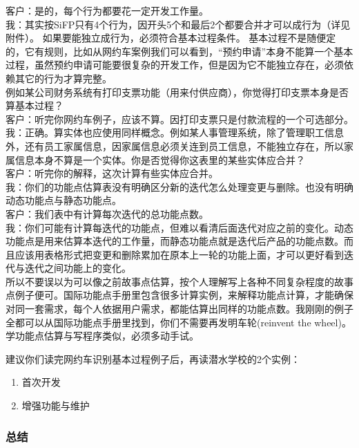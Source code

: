 {\begin{minipage}[t]{0.97\columnwidth}
客户：是的，每个行为都要花一定开发工作量。\\
我：其实按SiFP只有4个行为，因开头5个和最后2个都要合并才可以成行为（详见附件）。
如果要能独立成行为，必须符合基本过程条件。
基本过程不是随便定的，它有规则，比如从网约车案例我们可以看到，``预约申请''本身不能算一个基本过程，虽然预约申请可能要很复杂的开发工作，但是因为它不能独立存在，必须依赖其它的行为才算完整。\\
例如某公司财务系统有打印支票功能（用来付供应商），你觉得打印支票本身是否算基本过程？\\
客户：听完你网约车例子，应该不算。因打印支票只是付款流程的一个可选部分。\\
我：正确。算实体也应使用同样概念。例如某人事管理系统，除了管理职工信息外，还有员工家属信息，因家属信息必须关连到员工信息，不能独立存在，所以家属信息本身不算是一个实体。你是否觉得你这表里的某些实体应合并？\\
客户：听完你的解释，这次计算有些实体应合并。\\
我：你们的功能点估算表没有明确区分新的迭代怎么处理变更与删除。也没有明确动态功能点与静态功能点。\\
客户：我们表中有计算每次迭代的总功能点数。\\
我：你们可能有计算每迭代的功能点，但难以看清后面迭代对应之前的变化。动态功能点是用来估算本迭代的工作量，而静态功能点就是迭代后产品的功能点数。而且应该用表格形式把变更和删除累加在原本上一轮的功能上面，才可以更好看到迭代与迭代之间功能上的变化。\\
所以不要误以为可以像之前故事点估算，按个人理解写上各种不同复杂程度的故事点例子便可。国际功能点手册里包含很多计算实例，来解释功能点计算，才能确保对同一套需求，每个人依据用户需求，都能估算出同样的功能点数。我刚刚的例子全都可以从国际功能点手册里找到，你们不需要再发明车轮(reinvent
the wheel)。学功能点估算与写程序类似，必须多动手试。

建议你们读完网约车识别基本过程例子后，再读潜水学校的2个实例：

\begin{enumerate}
\tightlist
\item
  首次开发
\item
  增强功能与维护
\end{enumerate}\strut
\end{minipage}}

\hypertarget{ux603bux7ed3}{%
\subsubsection{总结}\label{ux603bux7ed3}}

